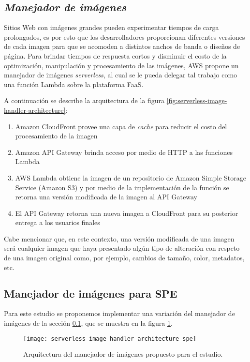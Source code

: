 \subsection{\emph{Manejador de imágenes}} \label{sec:manejador-imagenes-1}
Sitios Web con imágenes grandes pueden experimentar tiempos de carga prolongados, es por esto que los desarrolladores proporcionan diferentes versiones de cada imagen para que se acomoden a distintos anchos de banda o diseños de página. Para brindar tiempos de respuesta cortos y disminuir el costo de la optimización, manipulación y procesamiento de las imágenes, AWS propone un manejador de imágenes \emph{serverless}, al cual se le pueda delegar tal trabajo como una función Lambda sobre la plataforma FaaS.


A continuación se describe la arquitectura de la figura \ref{fig:serverless-image-handler-architecture}:
\begin{enumerate}
    \item Amazon CloudFront provee una capa de \emph{cache} para reducir el costo del procesamiento de la imagen
    \item Amazon API Gateway brinda acceso por medio de HTTP a las funciones Lambda
    \item AWS Lambda obtiene la imagen de un repositorio de Amazon Simple Storage Service (Amazon S3) y por medio de la implementación de la función se retorna una versión modificada de la imagen al API Gateway
    \item El API Gateway retorna una nueva imagen a CloudFront para su posterior entrega a los usuarios finales
\end{enumerate}

Cabe mencionar que, en este contexto, una versión modificada de una imagen será cualquier imagen que haya presentado algún tipo de alteración con respeto de una imagen original como, por ejemplo, cambios de tamaño, color, metadatos, etc.

\subsection{Manejador de imágenes para SPE} \label{sec:manejador-imagenes-spe}
Para este estudio se proponemos implementar una variación del manejador de imágenes de la sección \ref{sec:manejador-imagenes-1}, que se muestra en la figura \ref{fig:serverless-image-handler-architecture-spe}.

\begin{figure}[h]
  \centering
  \texttt{[image: serverless-image-handler-architecture-spe]}
  \caption[Arquitectura del manejador de imágenes propuesto para el estudio]{Arquitectura del manejador de imágenes propuesto para el estudio.}
  \label{fig:serverless-image-handler-architecture-spe}
\end{figure}

